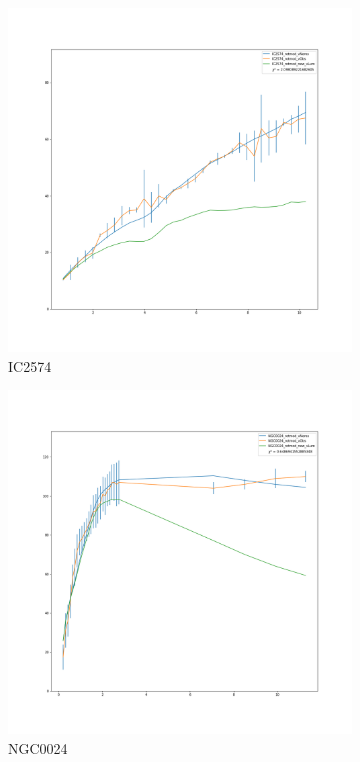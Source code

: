\documentclass[reprint,%
 amsmath,amssymb,
 aps,
]{revtex4-1}
\begin{document}
\clearpage
  \begin{figure}[h]
\begin{subfigure}{.5\textwidth}
  \centering
  \includegraphics[width=.8\linewidth]{figures/IC2574_rotmod_XueSofue.png}
  \caption{IC2574}
  \label{fig:sfig10}
\end{subfigure}
\begin{subfigure}{.5\textwidth}
  \centering
  \includegraphics[width=.8\linewidth]{figures/NGC0024_rotmod_XueSofue.png}
  \caption{NGC0024}
  \label{fig:sfig6}
\end{subfigure}%
\begin{subfigure}{.5\textwidth}

\end{subfigure}
\end{figure}
\end{document}
